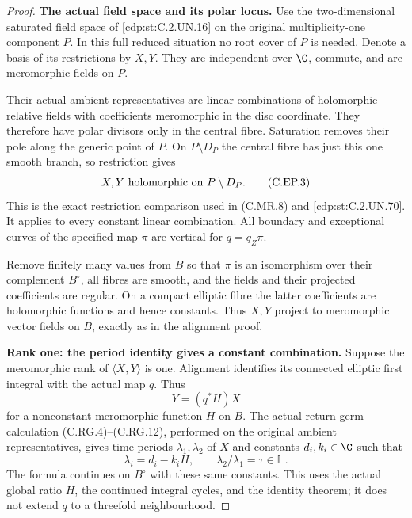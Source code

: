 \begin{proof}
\par\medskip\noindent\textbf{The actual field space and its polar locus.}
Use the two-dimensional saturated field space of
\ref{cdp:st:C.2.UN.16} on the original multiplicity-one component
\(P\). In this full reduced situation no root cover
of \(P\) is needed. Denote a basis of its restrictions
by \(X,Y\). They are independent over \(\C\), commute,
and are meromorphic fields on \(P\).

Their actual ambient representatives are linear
combinations of holomorphic relative fields with
coefficients meromorphic in the disc coordinate.
They therefore have polar divisors only in the
central fibre. Saturation removes their pole along
the generic point of \(P\). On \(P\setminus D_P\)
the central fibre has just this one smooth branch,
so restriction gives
\[
       X,Y\ \hbox{holomorphic on }P\setminus D_P .
 \tag{C.EP.3}\label{cdp:eq:C.EP.3}
\]
This is the exact restriction comparison used in
(C.MR.8) and \ref{cdp:st:C.2.UN.70}. It applies to every constant
linear combination. All boundary and exceptional
curves of the specified map \(\pi\) are vertical
for \(q=q_Z\pi\).

Remove finitely many values from \(B\) so that
\(\pi\) is an isomorphism over their complement
\(B^\circ\), all fibres are smooth, and the fields
and their projected coefficients are regular.
On a compact elliptic fibre the latter coefficients
are holomorphic functions and hence constants.
Thus \(X,Y\) project to meromorphic vector fields
on \(B\), exactly as in the alignment proof.

\par\medskip\noindent\textbf{Rank one: the period identity gives a constant combination.}
Suppose the meromorphic rank of \(\langle X,Y\rangle\)
is one. Alignment identifies its connected elliptic
first integral with the actual map \(q\). Thus
\[
                       Y=(q^*H)X
 \tag{C.EP.4}\label{cdp:eq:C.EP.4}
\]
for a nonconstant meromorphic function \(H\) on
\(B\). The actual return-germ calculation
(C.RG.4)--(C.RG.12), performed on the original
ambient representatives, gives time periods
\(\lambda_1,\lambda_2\) of \(X\) and constants
\(d_i,k_i\in\C\) such that
\[
            \lambda_i=d_i-k_iH,\qquad
            \lambda_2/\lambda_1=\tau\in\mathbb H .
 \tag{C.EP.5}\label{cdp:eq:C.EP.5}
\]
The formula continues on \(B^\circ\) with these
same constants. This uses the actual global ratio
\(H\), the continued integral cycles, and the
identity theorem; it does not extend \(q\) to a
threefold neighbourhood.


\end{proof}
